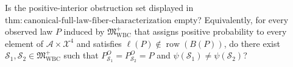 Is the positive-interior obstruction set displayed in \(\mathrm{thm{:}canonical\text{-}full\text{-}law\text{-}fiber\text{-}characterization}\) empty?  Equivalently, for every observed law \(P\) induced by \(\mathfrak M_{\mathrm{WBC}}^{+}\) that assigns positive probability to every element of \(\mathcal A\times\mathcal X^4\) and satisfies \(\ell(P)\notin\operatorname{row}(B(P))\), do there exist \(\mathcal S_1,\mathcal S_2\in\mathfrak M_{\mathrm{WBC}}^{+}\) such that \(P_{\mathcal S_1}^O=P_{\mathcal S_2}^O=P\) and \(\psi(\mathcal S_1)\ne\psi(\mathcal S_2)\)?